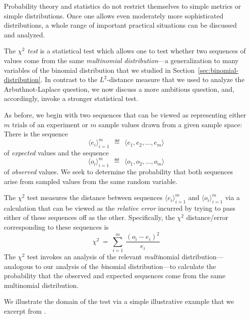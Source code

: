 Probability theory and statistics do not restrict themselves to simple metrics or simple distributions.  Once one allows even moderately more sophisticated distributions, a whole range of important practical situations can be discussed and analyzed.

\medskip

The {\it $\chi^2$ test} is a statistical test which allows one to test whether two sequences of values come from the same {\em multinomial distribution}---a generalization to many variables of the binomial distribution that we studied in Section~\ref{sec:binomial-distribution}.  In contrast to the $L^2$-distance measure that we used to analyze the Arbuthnot-Laplace question, we now discuss a more ambitious question, and, accordingly, invoke a stronger statistical test.

\smallskip

As before, we begin with two sequences that can be viewed as representing either $m$ trials of an experiment or $m$ sample values drawn from a given sample space:  There is the sequence 
\[ \langle e_i \rangle_{i=1}^m \ \ \eqdef \ \ \langle e_1, e_2, \ldots, e_m \rangle \]
of {\em expected} values and the  sequence
\[ \langle o_i \rangle_{i=1}^m \ \ \eqdef \ \ \langle o_1, o_2, \ldots, o_m \rangle \]
of {\em observed} values.  We seek to determine the probability that both sequences arise from sampled values from the same random variable.

\smallskip

The $\chi^2$ test measures the distance between sequences $\langle e_i \rangle_{i=1}^m$ and $\langle o_i \rangle_{i=1}^m$ via a calculation that can be viewed as the {\em relative error} incurred by trying to pass either of these sequences off as the other.  Specifically, the $\chi^2$ distance/error corresponding to these sequences is
\[ \chi^2 \ = \ \sum_{i=1}^m \ \frac{(o_i- e_i)^2}{e_i} \]
The $\chi^2$ test invokes an analysis of the relevant {\em multi}nomial distribution---analogous to our analysis of the {\em bi}nomial distribution---to calculate the probability that the observed and expected sequences come from the same multinomial distribution.

\medskip

We illustrate the domain of the test via a simple illustrative example that we excerpt from \cite{Hoel58}.

\bigskip

